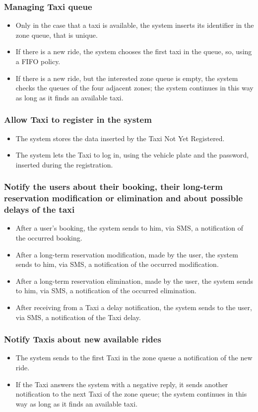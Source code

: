 		\subsubsection{Managing Taxi queue}
		\begin{itemize}
			\item Only in the case that a taxi is available, the system inserts its identifier in the zone queue, that is unique.
			\item If there is a new ride, the system chooses the first taxi in the queue, so, using a FIFO policy.
			\item If there is a new ride, but the interested zone queue is empty, the system checks the queues of the four adjacent zones; the system continues in this way as long as it finds an available taxi.
		\end{itemize}
		\subsubsection{Allow Taxi to register in the system}
		\begin{itemize}
			\item The system stores the data inserted by the Taxi Not Yet Registered.
			\item The system lets the Taxi to log in, using the vehicle plate and the password, inserted during the registration.
		\end{itemize}
		\subsubsection{Notify the users about their booking, their long-term reservation modification or elimination and about possible delays of the taxi}
		\begin{itemize}
			\item After a user's booking, the system sends to him, via SMS, a notification of the occurred booking. 
			\item After a long-term reservation modification, made by the user, the system sends to him, via SMS, a notification of the occurred modification.
			\item After a long-term reservation elimination, made by the user, the system sends to him, via SMS, a notification of the occurred elimination.
			\item After receiving from a Taxi a delay notification, the system sends to the user, via SMS, a notification of the Taxi delay.
		\end{itemize}
		\subsubsection{Notify Taxis about new available rides}
		\begin{itemize}
			\item The system sends to the first Taxi in the zone queue a notification of the new ride.
			\item If the Taxi answers the system with a negative reply, it sends another notification to the next Taxi of the zone queue; the system continues in this way as long as it finds an available taxi. 
		\end{itemize}
